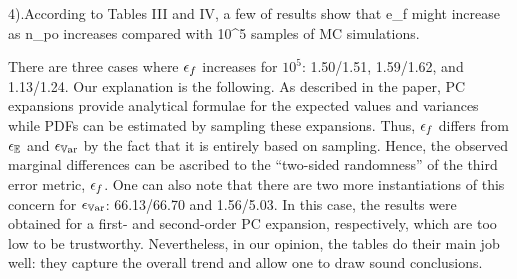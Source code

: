 \begin{authors}
\end{authors}

\begin{reviewer}
4).According to Tables III and IV, a few of results show that e\_f might increase as n\_po increases compared with 10\^{}5 samples of MC simulations.
\end{reviewer}
\begin{authors}
There are three cases where $\epsilon_f$ increases for $10^5$: 1.50/1.51, 1.59/1.62, and 1.13/1.24.
Our explanation is the following.
As described in the paper, PC expansions provide analytical formulae for the expected values and variances while PDFs can be estimated by sampling these expansions.
Thus, $\epsilon_f$ differs from $\epsilon_\mathbb{E}$ and $\epsilon_{\mathbb{V}\text{ar}}$ by the fact that it is entirely based on sampling.
Hence, the observed marginal differences can be ascribed to the ``two-sided randomness'' of the third error metric, $\epsilon_f$.
One can also note that there are two more instantiations of this concern for $\epsilon_{\mathbb{V}\text{ar}}$: 66.13/66.70 and 1.56/5.03.
In this case, the results were obtained for a first- and second-order PC expansion, respectively, which are too low to be trustworthy.
Nevertheless, in our opinion, the tables do their main job well: they capture the overall trend and allow one to draw sound conclusions.

\end{authors}

